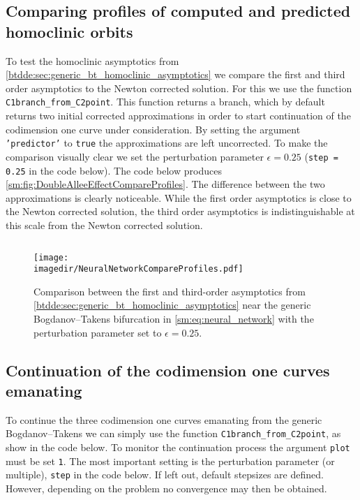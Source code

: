 \subsection{Comparing profiles of computed and predicted homoclinic orbits}
To test the homoclinic asymptotics from
\cref{btdde:sec:generic_bt_homoclinic_asymptotics} we compare the first and third
order asymptotics to the Newton corrected solution. For this we use the 
function \texttt{C1branch_from_C2point}. This function returns a branch, which
by default returns two initial corrected approximations in order to start continuation of the
codimension one curve under consideration. By setting the argument
\texttt{'predictor'} to \texttt{true} the approximations are left uncorrected.
To make the comparison visually clear we set the perturbation parameter 
$\epsilon=0.25$ (\texttt{step = 0.25} in the code below).
The code below produces \cref{sm:fig:DoubleAlleeEffectCompareProfiles}.
The difference between the two approximations is clearly noticeable. While
the first order asymptotics is close to the Newton corrected solution, the third
order asymptotics is indistinguishable at this scale from the Newton corrected
solution.
\inputminted[firstline=64, lastline=82]{MATLAB}{\pathToDDEBifToolDemos/neural_network_model/neural_network_model.m}
\begin{figure}[ht]
    \texttt{[image: \\imagedir/NeuralNetworkCompareProfiles.pdf]}
    \caption{Comparison between the first and third-order asymptotics from
    \cref{btdde:sec:generic_bt_homoclinic_asymptotics} near the generic
        Bogdanov--Takens bifurcation in \cref{sm:eq:neural_network} with the
        perturbation parameter set to $\epsilon=0.25$.}
    \label{sm:fig:NeuralNetworkCompareProfiles}
\end{figure}

\label{sm:sec:neural_network_model:continuation}
\subsection{Continuation of the codimension one curves emanating}
To continue the three codimension one curves emanating from the generic
Bogdanov--Takens we can simply use the function
\texttt{C1branch_from_C2point}, as show in the code below. To monitor the
continuation process the argument \texttt{plot} must be set \texttt{1}.
The most important setting is the perturbation parameter (or multiple),
\texttt{step} in the code below. If left out, default stepsizes are defined.
However, depending on the problem no convergence may then be obtained.
\inputminted[firstline=84, lastline=102]{MATLAB}{\pathToDDEBifToolDemos/neural_network_model/neural_network_model.m}

